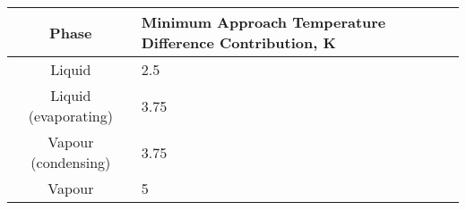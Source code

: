 \begin{tabular}{|c p{6cm}|}
    \hline
    \rowcolor{bluepoli!40} %
    \textbf{Phase} & \textbf{Minimum Approach \newline Temperature Difference \newline Contribution, K} \T\B \\
    \hline \hline
    Liquid & \hfill2.5\hfill \T\B\\
    Liquid (evaporating) & \hfill3.75\hfill \T\B\\
    Vapour (condensing)  & \hfill3.75\hfill \T\B\\
    Vapour & \hfill5\hfill\T\B\\
    \hline
\end{tabular}
